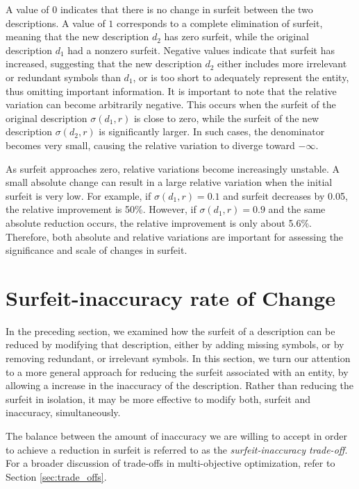 A value of $0$ indicates that there is no change in surfeit between the two descriptions. A value of $1$ corresponds to a complete elimination of surfeit, meaning that the new description $d_2$ has zero surfeit, while the original description $d_1$ had a nonzero surfeit. Negative values indicate that surfeit has increased, suggesting that the new description $d_2$ either includes more irrelevant or redundant symbols than $d_1$, or is too short to adequately represent the entity, thus omitting important information. It is important to note that the relative variation can become arbitrarily negative. This occurs when the surfeit of the original description $\sigma(d_1, r)$ is close to zero, while the surfeit of the new description $\sigma(d_2, r)$ is significantly larger. In such cases, the denominator becomes very small, causing the relative variation to diverge toward $-\infty$.

As surfeit approaches zero, relative variations become increasingly unstable. A small absolute change can result in a large relative variation when the initial surfeit is very low. For example, if $\sigma(d_1, r) = 0.1$ and surfeit decreases by 0.05, the relative improvement is 50\%. However, if $\sigma(d_1, r) = 0.9$ and the same absolute reduction occurs, the relative improvement is only about 5.6\%. Therefore, both absolute and relative variations are important for assessing the significance and scale of changes in surfeit.

%
%

\section{Surfeit-inaccuracy rate of Change}
\label{Surfeit_inaccuracy_rate_of_Change}

In the preceding section, we examined how the surfeit of a description can be reduced by modifying that description, either by adding missing symbols, or by removing redundant, or irrelevant symbols. In this section, we turn our attention to a more general approach for reducing the surfeit associated with an entity, by allowing a increase in the inaccuracy of the description. Rather than reducing the surfeit in isolation, it may be more effective to modify both, surfeit and inaccuracy, simultaneously.

The balance between the amount of inaccuracy we are willing to accept in order to achieve a reduction in surfeit is referred to as the \emph{surfeit-inaccuracy trade-off}. For a broader discussion of trade-offs in multi-objective optimization, refer to Section \ref{sec:trade_offs}.

